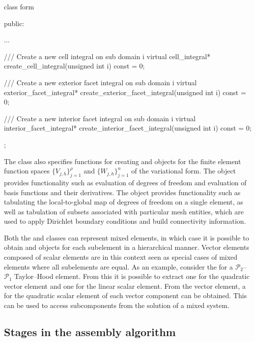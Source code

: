 \begin{c++}
class form
{
public:

  ...

  /// Create a new cell integral on sub domain i
  virtual cell_integral* create_cell_integral(unsigned int i) const = 0;

  /// Create a new exterior facet integral on sub domain i
  virtual exterior_facet_integral* create_exterior_facet_integral(unsigned int i) const = 0;

  /// Create a new interior facet integral on sub domain i
  virtual interior_facet_integral* create_interior_facet_integral(unsigned int i) const = 0;

};
\end{c++}

The  class also specifies functions for creating
 and  objects for the finite
element function spaces $\{V_{j,h}\}_{j=1}^{\rho}$ and
$\{W_{j,h}\}_{j=1}^n$ of the variational form. The
 object provides functionality such as evaluation
of degrees of freedom and evaluation of basis functions and their
derivatives. The  object provides functionality such as
tabulating the local-to-global map of degrees of freedom on a single
element, as well as tabulation of subsets associated with particular
mesh entities, which are used to apply Dirichlet boundary conditions
and build connectivity information.

Both the  and  classes can
represent mixed elements, in which case it is possible to obtain
 and  objects for each subelement
in a hierarchical manner. Vector elements composed of scalar elements
are in this context seen as special cases of mixed elements where all
subelements are equal. As an example, consider the  for
a $\mathcal{P}_2$--$\mathcal{P}_1$ Taylor--Hood element. From this
 it is possible to extract one  for the
quadratic vector element and one  for the linear scalar
element. From the vector element, a  for the quadratic
scalar element of each vector component can be obtained. This can be
used to access subcomponents from the solution of a mixed system.

\subsection{Stages in the assembly algorithm}

